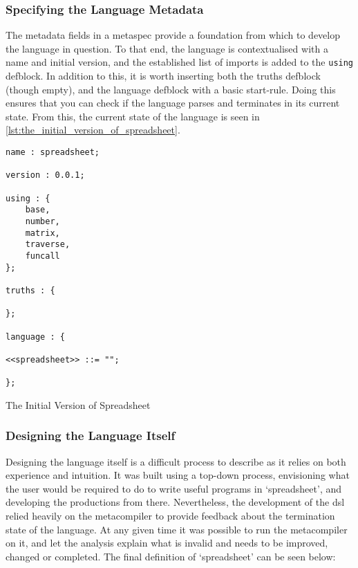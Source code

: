 \subsubsection{Specifying the Language Metadata} %
\label{ssub:specifying_the_language_metadata}
The metadata fields in a \gls{metaspec} provide a foundation from which to develop the language in question. 
To that end, the language is contextualised with a name and initial version, and the established list of imports is added to the \texttt{using} defblock. 
In addition to this, it is worth inserting both the truths defblock (though empty), and the language defblock with a basic start-rule. 
Doing this ensures that you can check if the language parses and terminates in its current state.
From this, the current state of the language is seen in \autoref{lst:the_initial_version_of_spreadsheet}. 

\begin{listing}[!htb]
\begin{verbatim}
name : spreadsheet;

version : 0.0.1;

using : {
    base,
    number,
    matrix,
    traverse,
    funcall
};

truths : {

};

language : {

<<spreadsheet>> ::= "";

};
\end{verbatim}
\caption{The Initial Version of Spreadsheet}
\label{lst:the_initial_version_of_spreadsheet}
\end{listing}


\subsubsection{Designing the Language Itself} %
\label{ssub:designing_the_language_itself}
Designing the language itself is a difficult process to describe as it relies on both experience and intuition. 
It was built using a top-down process, envisioning what the user would be required to do to write useful programs in `spreadsheet', and developing the productions from there.
Nevertheless, the development of the \gls{dsl} relied heavily on the metacompiler to provide feedback about the termination state of the language. 
At any given time it was possible to run the metacompiler on it, and let the analysis explain what is invalid and needs to be improved, changed or completed. 
The final definition of `spreadsheet' can be seen below:

